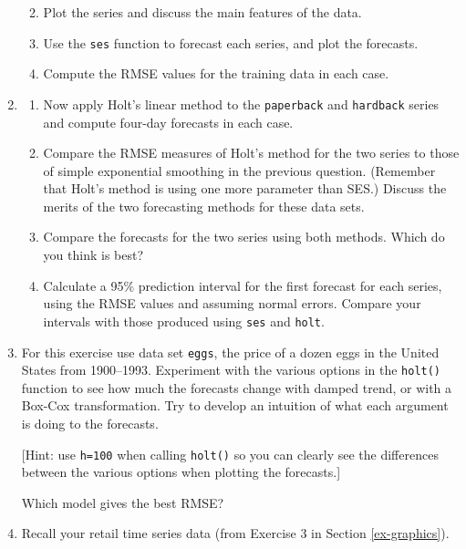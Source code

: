 \documentclass[]{book}
\providecommand{\tightlist}{%
  \setlength{\itemsep}{0pt}\setlength{\parskip}{0pt}}
\begin{document}
\begin{enumerate}
  \begin{enumerate}
  \def\labelenumii{\alph{enumii}.}
  \tightlist
  \item
    Plot the series and discuss the main features of the data.
  \item
    Use the \texttt{ses} function to forecast each series, and plot the forecasts.
  \item
    Compute the RMSE values for the training data in each case.
  \end{enumerate}
\item
  \begin{enumerate}
  \def\labelenumii{\alph{enumii}.}
  \tightlist
  \item
    Now apply Holt's linear method to the \texttt{paperback} and \texttt{hardback} series and compute four-day forecasts in each case.
  \item
    Compare the RMSE measures of Holt's method for the two series to those of simple exponential smoothing in the previous question. (Remember that Holt's method is using one more parameter than SES.) Discuss the merits of the two forecasting methods for these data sets.
  \item
    Compare the forecasts for the two series using both methods. Which do you think is best?
  \item
    Calculate a 95\% prediction interval for the first forecast for each series, using the RMSE values and assuming normal errors. Compare your intervals with those produced using \texttt{ses} and \texttt{holt}.
  \end{enumerate}
\item
  For this exercise use data set \texttt{eggs}, the price of a dozen eggs in the United States from 1900--1993. Experiment with the various options in the \texttt{holt()} function to see how much the forecasts change with damped trend, or with a Box-Cox transformation. Try to develop an intuition of what each argument is doing to the forecasts.

  {[}Hint: use \texttt{h=100} when calling \texttt{holt()} so you can clearly see the differences between the various options when plotting the forecasts.{]}

  Which model gives the best RMSE?
\item
  Recall your retail time series data (from Exercise 3 in Section \ref{ex-graphics}).


\end{enumerate}
\end{document}
